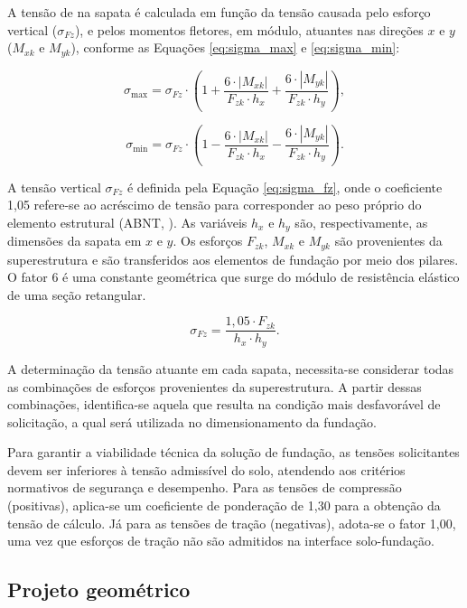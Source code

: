 A tensão de na sapata é calculada em função da tensão causada pelo esforço vertical ($\sigma_{Fz}$), e pelos momentos fletores, em módulo, atuantes nas direções $x$ e $y$ ($M_{xk}$ e $M_{yk}$), conforme as  Equações \eqref{eq:sigma_max} e \eqref{eq:sigma_min}:

\begin{equation}
\sigma_{\text{max}} = \sigma_{Fz} \cdot \left( 1 + \frac{6 \cdot | M_{xk} |}{F_{zk} \cdot h_x} + \frac{6 \cdot |M_{yk}|}{F_{zk} \cdot h_y} \right),
\label{eq:sigma_max}
\end{equation}

\begin{equation}
\sigma_{\text{min}} = \sigma_{Fz} \cdot \left( 1 - \frac{6 \cdot | M_{xk}|}{F_{zk} \cdot h_x} - \frac{6 \cdot |M_{yk}|}{F_{zk} \cdot h_y} \right).
\label{eq:sigma_min}
\end{equation}

A tensão vertical $\sigma_{Fz}$ é definida pela Equação \eqref{eq:sigma_fz}, onde o coeficiente 1,05 refere-se ao acréscimo de tensão para corresponder ao peso próprio do elemento estrutural (ABNT, \citeyear{nbr6122}). As variáveis $h_x$ e $h_y$ são, respectivamente, as dimensões da sapata em $x$ e $y$. Os esforços $F_{zk}$, $M_{xk}$ e $M_{yk}$ são provenientes da superestrutura e são transferidos aos elementos de fundação por meio dos pilares. O fator 6 é uma constante geométrica que surge do módulo de resistência elástico de uma seção retangular. 
 
\begin{equation}
    \sigma_{Fz} = \frac{1,05 \cdot F_{zk}}{h_x \cdot h_y}.
    \label{eq:sigma_fz}
\end{equation}

A determinação da tensão atuante em cada sapata, necessita-se considerar todas as combinações de esforços provenientes da superestrutura. A partir dessas combinações, identifica-se aquela que resulta na condição mais desfavorável de solicitação, a qual será utilizada no dimensionamento da fundação.

Para garantir a viabilidade técnica da solução de fundação, as tensões solicitantes devem ser inferiores à tensão admissível do solo, atendendo aos critérios normativos de segurança e desempenho. Para as tensões de compressão (positivas), aplica-se um coeficiente de ponderação de 1,30 para a obtenção da tensão de cálculo. Já para as tensões de tração (negativas), adota-se o fator 1,00, uma vez que esforços de tração não são admitidos na interface solo-fundação.
\subsection{Projeto geométrico} 

